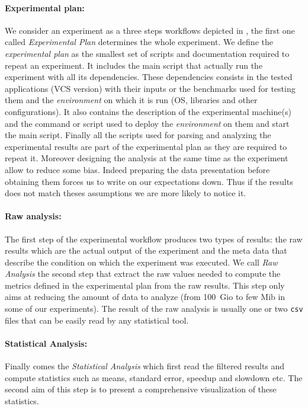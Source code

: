 \paragraph{Experimental plan:}
We consider an experiment as a three steps workflows depicted in , the first one called \emph{Experimental Plan} determines the whole experiment.
We define the \emph{experimental plan} as the smallest set of scripts and documentation required to repeat an experiment.
It includes the main script that actually run the experiment with all its dependencies.
These dependencies consists in the tested applications (\gls{VCS} version) with their inputs or the benchmarks used for testing them and the \emph{environment} on which it is run (\gls{OS}, libraries and other configurations).
It also contains the description of the experimental machine(s) and the command or script used to deploy the \emph{environment} on them and start the main script.
Finally all the scripts used for parsing and analyzing the experimental results are part of the experimental plan as they are required to repeat it.
Moreover designing the analysis at the same time as the experiment allow to reduce some bias.
Indeed preparing the data presentation before obtaining them forces us to write on our expectations down.
Thus if the results does not match theses assumptions we are more likely to notice it.

\paragraph{Raw analysis:}
The first step of the experimental workflow produces two types of results: the raw results which are the actual output of the experiment and the meta data that describe the condition on which the experiment was executed.
We call \emph{Raw Analysis} the second step that extract the raw values needed to compute the metrics defined in the experimental plan from the raw results.
This step only aims at reducing the amount of data to analyze (from \SI{100}{Gio} to few Mib in some of our experiments).
The result of the raw analysis is usually one or two \texttt{csv} files that can be easily read by any statistical tool.

\paragraph{Statistical Analysis:}
Finally comes the \emph{Statistical Analysis} which first read the filtered results and compute statistics such as means, standard error, speedup and slowdown etc.
The second aim of this step is to present a comprehensive visualization of these statistics.

